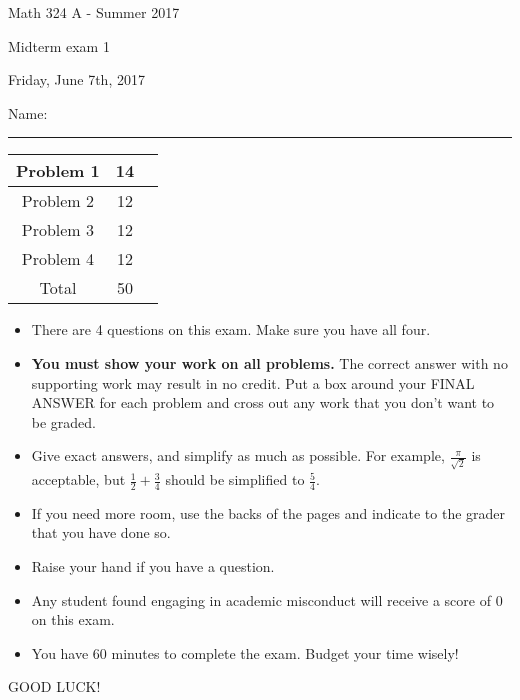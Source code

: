 \documentclass[12 pt]{report}
\begin{document}
\noindent \vfill \noindent \large

\centerline{Math 324 A - Summer 2017}

\centerline{Midterm exam 1}

\centerline{Friday, June 7th, 2017}

\normalsize

\vfill
\medskip
Name: \rule{10cm}{1pt}

\bigskip

\vfill
\begin{center}
{\large
\begin{tabular}{||c|c|r||}
\hline Problem 1 & 14 & \hspace{10mm} \hfill \\
\hline Problem 2 & 12  & \hspace{10mm} \hfill \\
\hline Problem 3 & 12 & \hspace{10mm} \hfill \\
\hline Problem 4 & 12  & \hspace{10mm} \hfill \\
\hline Total & 50 & \hspace{10mm} \hfill \\
\hline
\end{tabular}
}
\end{center}
\vfill
\begin{itemize}
\item There are 4 questions on this exam. Make sure you have all four.
\item \textbf{You must show your work on all problems.}  The correct answer
with no supporting work may result in no credit. Put a box
around your FINAL ANSWER for each problem and cross out any work
that you don't want to be graded.
\item Give exact answers, and simplify as much as possible. 
For example, $\frac{\pi}{\sqrt{2}}$ is acceptable, but $\frac{1}{2} + \frac{3}{4}$
should be simplified to $\frac{5}{4}$.  

\item If you need more room, use the backs
of the pages and indicate to the grader that you have done so.
\item Raise your hand if you have a question.
\item Any student found engaging in academic misconduct will receive
a score of 0 on this exam.
\item You have 60 minutes to complete the exam.  Budget your time wisely! \\
\end{itemize}
\vfill
\begin{center}GOOD LUCK!\end{center}
\end{document}
